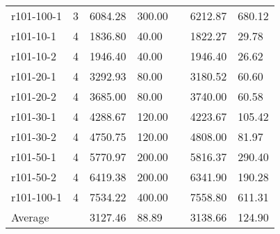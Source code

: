 \documentclass[final,5p,times,twocolumn]{elsarticle}
\begin{document}
{{{{{{{\begin{table}[htbp]
\begin{tabular}{l l l l l l l}
r101-100-1&3&6084.28&300.00&&6212.87&680.12\\
r101-10-1&4&1836.80&40.00&&1822.27&29.78\\
r101-10-2&4&1946.40&40.00&&1946.40&26.62\\
r101-20-1&4&3292.93&80.00&&3180.52&60.60\\
r101-20-2&4&3685.00&80.00&&3740.00&60.58\\
r101-30-1&4&4288.67&120.00&&4223.67&105.42\\
r101-30-2&4&4750.75&120.00&&4808.00&81.97\\
r101-50-1&4&5770.97&200.00&&5816.37&290.40\\
r101-50-2&4&6419.38&200.00&&6341.90&190.28\\
r101-100-1&4&7534.22&400.00&&7558.80&611.31\\
\hline
Average&&3127.46&88.89&&3138.66&124.90\\
\hline
\end{tabular}
\label{tab:pt200_5}
\end{table}

}}}}}}}
\end{document}

